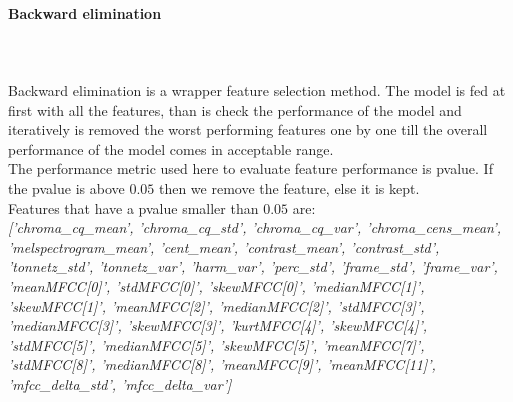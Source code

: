 \paragraph{Backward elimination}
\mbox{} \\ \\
Backward elimination is a wrapper feature selection method. The model is fed at first with all the features, than is check the performance of the model and iteratively is removed the worst performing features one by one till the overall performance of the model comes in acceptable range.
\\
The performance metric used here to evaluate feature performance is pvalue. If the pvalue is above $0.05$ then we remove the feature, else it is kept.
\\
Features that have a pvalue smaller than $0.05$ are:
\\ \linebreak 
\textit{['chroma\_cq\_mean', 'chroma\_cq\_std', 'chroma\_cq\_var', 'chroma\_cens\_mean', 'melspectrogram\_mean', 'cent\_mean', 'contrast\_mean', 'contrast\_std', 'tonnetz\_std', 'tonnetz\_var', 'harm\_var', 'perc\_std', 'frame\_std', 'frame\_var', 'meanMFCC[0]', 'stdMFCC[0]', 'skewMFCC[0]', 'medianMFCC[1]', 'skewMFCC[1]', 'meanMFCC[2]', 'medianMFCC[2]', 'stdMFCC[3]', 'medianMFCC[3]', 'skewMFCC[3]', 'kurtMFCC[4]', 'skewMFCC[4]', 'stdMFCC[5]', 'medianMFCC[5]', 'skewMFCC[5]', 'meanMFCC[7]', 'stdMFCC[8]', 'medianMFCC[8]', 'meanMFCC[9]', 'meanMFCC[11]', 'mfcc\_delta\_std', 'mfcc\_delta\_var']}

